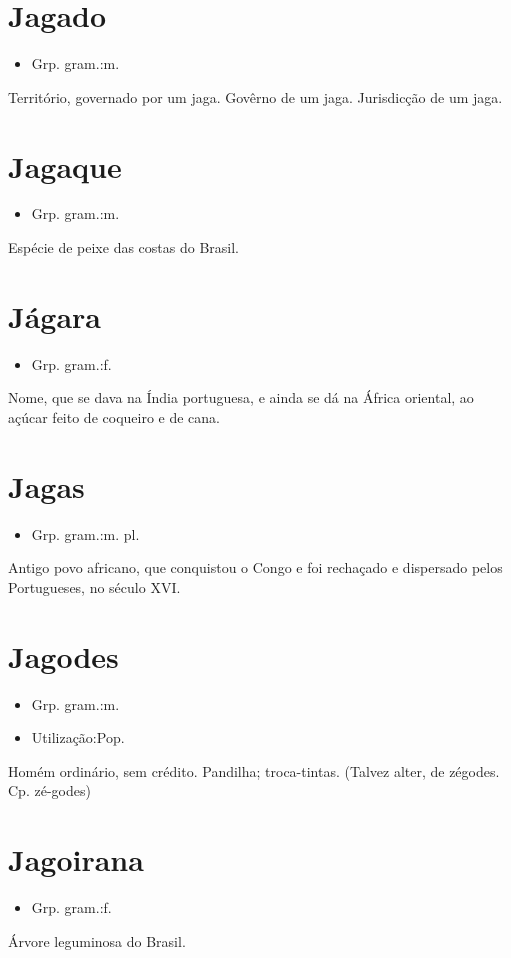 \documentclass{article}
\begin{document}
\section{Jagado}
\begin{itemize}
\item {Grp. gram.:m.}
\end{itemize}
Território, governado por um jaga.
Govêrno de um jaga.
Jurisdicção de um jaga.
\section{Jagaque}
\begin{itemize}
\item {Grp. gram.:m.}
\end{itemize}
Espécie de peixe das costas do Brasil.
\section{Jágara}
\begin{itemize}
\item {Grp. gram.:f.}
\end{itemize}
Nome, que se dava na Índia portuguesa, e ainda se dá na África oriental, ao açúcar feito de coqueiro e de cana.
\section{Jagas}
\begin{itemize}
\item {Grp. gram.:m. pl.}
\end{itemize}
Antigo povo africano, que conquistou o Congo e foi rechaçado e dispersado pelos Portugueses, no século XVI.
\section{Jagodes}
\begin{itemize}
\item {Grp. gram.:m.}
\end{itemize}
\begin{itemize}
\item {Utilização:Pop.}
\end{itemize}
Homém ordinário, sem crédito.
Pandilha; troca-tintas.
(Talvez alter, de \textunderscore zégodes\textunderscore . Cp. \textunderscore zé-godes\textunderscore )
\section{Jagoirana}
\begin{itemize}
\item {Grp. gram.:f.}
\end{itemize}
Árvore leguminosa do Brasil.
\end{document}
